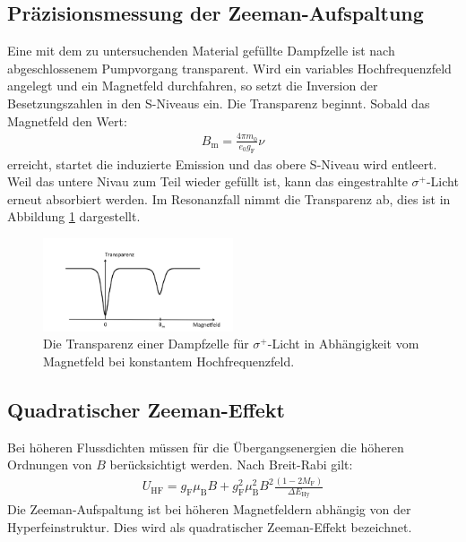 \subsection{Präzisionsmessung der Zeeman-Aufspaltung}
Eine mit dem zu untersuchenden Material gefüllte Dampfzelle ist nach abgeschlossenem Pumpvorgang transparent.
Wird ein variables Hochfrequenzfeld angelegt und ein Magnetfeld durchfahren, so setzt die Inversion der Besetzungszahlen in den S-Niveaus ein. Die Transparenz
beginnt. Sobald das Magnetfeld den Wert:
\begin{align}
  B_\mathrm{m}=\frac{4\pi m_\mathrm{0}}{e_\mathrm{0}g_\mathrm{F}}\nu \label{eqn:keineahnung}
\end{align}
erreicht, startet die induzierte Emission und das obere S-Niveau wird
entleert. Weil das untere Nivau zum Teil wieder gefüllt ist, kann das
eingestrahlte $\sigma^+$-Licht erneut absorbiert werden.
Im Resonanzfall nimmt die Transparenz ab, dies ist in Abbildung \ref{fig:Transparenz}
dargestellt.
\begin{figure}
    \centering
    \includegraphics[width=0.5\textwidth]{transparenz.PNG}
    \caption{Die Transparenz einer Dampfzelle für $\sigma^+$-Licht in Abhängigkeit vom Magnetfeld
    bei konstantem Hochfrequenzfeld.\cite{skript}}
    \label{fig:Transparenz}
\end{figure}

\subsection{Quadratischer Zeeman-Effekt}
Bei höheren Flussdichten müssen für die Übergangsenergien die höheren Ordnungen von $B$ berücksichtigt werden. Nach Breit-Rabi gilt:
\begin{align}
  U_\mathrm{HF}=g_\mathrm{F}\mu_\mathrm{B}B+ g^2_\mathrm{F}\mu^2_\mathrm{B}B^2\frac{(1-2M_\mathrm{F})}{\Delta E_\mathrm{Hy}}
\end{align}
Die Zeeman-Aufspaltung ist bei höheren Magnetfeldern abhängig von der Hyperfeinstruktur. Dies wird als quadratischer Zeeman-Effekt bezeichnet.
